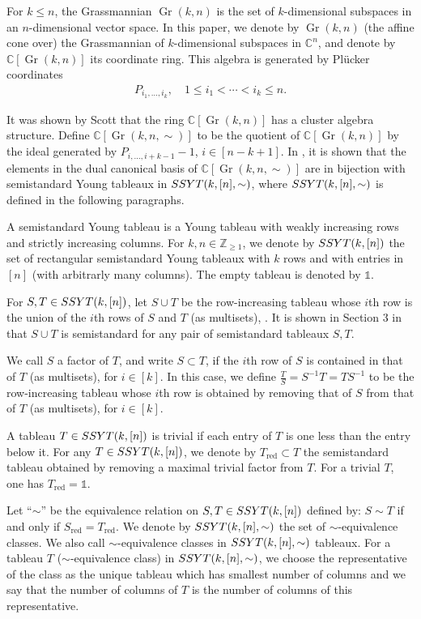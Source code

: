 \documentclass[12pt, reqno]{amsart}
\theoremstyle{plain}
\theoremstyle{definition}
\numberwithin{equation}{section}
\newcommand{\CC}{{\mathbb {C}}}
\newcommand{\ZZ}{{\mathbb {Z}}}
\DeclareMathOperator{\Gr}{Gr}
\begin{document}
For $k \le n$, the Grassmannian $\Gr(k,n)$ is the set of $k$-dimensional subspaces in an $n$-dimensional vector space. In this paper, we denote by $\Gr(k,n)$ (the affine cone over) the Grassmannian of $k$-dimensional subspaces in $\CC^n$, and denote by $\CC[\Gr(k,n)]$ its coordinate ring. This algebra is generated by Pl\"{u}cker coordinates 
\begin{align*}
P_{i_1, \ldots, i_{k}}, \quad 1 \leq i_1 < \cdots < i_{k} \leq n.
\end{align*}

It was shown by Scott \cite{Sco06} that the ring $\CC[\Gr(k,n)]$ has a cluster algebra structure. Define $\CC[\Gr(k,n,\sim)]$ to be the quotient of $\CC[\Gr(k,n)]$ by the ideal generated by $P_{i, \ldots, i+k-1}-1$, $i \in [n-k+1]$. In \cite{CDFL}, it is shown that the elements in the dual canonical basis of $\CC[\Gr(k,n,\sim)]$ are in bijection with semistandard Young tableaux in ${\rm SSYT}(k, [n],\sim)$, where ${\rm SSYT}(k, [n],\sim)$ is defined in the following paragraphs. 

A semistandard Young tableau is a Young tableau with weakly increasing rows and strictly increasing columns. For $k,n \in \ZZ_{\ge 1}$, we denote by ${\rm SSYT}(k, [n])$ the set of rectangular semistandard Young tableaux with $k$ rows and with entries in $[n]$ (with arbitrarly many columns). The empty tableau is denoted by $\mathds{1}$. 

For $S,T \in {\rm SSYT}(k, [n])$, let $S \cup T$ be the row-increasing tableau whose $i$th row is the union of the $i$th rows of $S$ and $T$ (as multisets), \cite{CDFL}. It is shown in Section 3 in \cite{CDFL} that $S \cup T$ is semistandard for any pair of semistandard tableaux $S, T$.  

We call $S$ a factor of $T$, and write $S \subset T$, if the $i$th row of $S$ is contained in that of $T$ (as multisets), for $i \in [k]$. In this case, we define $\frac{T}{S}=S^{-1}T=TS^{-1}$ to be the row-increasing tableau whose $i$th row is obtained by removing that of $S$ from that of $T$ (as multisets), for $i \in [k]$. 

A tableau $T \in {\rm SSYT}(k, [n])$ is trivial if each entry of $T$ is one less than the entry below it. For any $T \in {\rm SSYT}(k, [n])$, we  denote by $T_{\text{red}} \subset T$ the semistandard tableau obtained by removing a maximal trivial factor from $T$. For a trivial $T$, one has $T_{\text{red}} = \mathds{1}$. 

Let ``$\sim$'' be the equivalence relation on $S, T \in {\rm SSYT}(k, [n])$ defined by: $S \sim T$ if and only if $S_{\text{red}} = T_{\text{red}}$. We denote by ${\rm SSYT}(k, [n],\sim)$ the set of $\sim$-equivalence classes. We also call $\sim$-equivalence classes in ${\rm SSYT}(k, [n],\sim)$ tableaux. For a tableau $T$ ($\sim$-equivalence class) in ${\rm SSYT}(k, [n],\sim)$, we choose the representative of the class as the unique tableau which has smallest number of columns and we say that the number of columns of $T$ is the number of columns of this representative.
 
\end{document}
